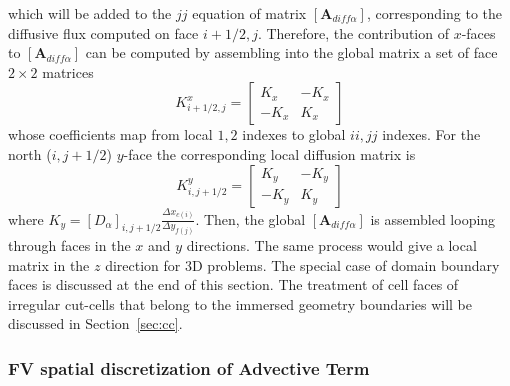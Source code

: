 \documentclass[12pt]{article}
\begin{document}
%
which will be added to the $jj$ equation of matrix $\left[ \mathbf{A}_{diff \alpha} \right]$, corresponding to the diffusive flux computed on face $i+1/2,j$. Therefore, the contribution of $x$-faces to $\left[ \mathbf{A}_{diff \alpha} \right]$ can be computed by assembling into the global matrix a set of face $2 \times 2$ matrices
%
\begin{equation}
   K^x_{i+1/2,j} = \left[ \begin{array}{cc} K_x & -K_x \\ -K_x & K_x \end{array} \right]
\end{equation}
whose coefficients map from local $1,2$ indexes to global $ii,jj$ indexes. 
For the north ($i,j+1/2$) $y$-face the corresponding local diffusion matrix is
%
\begin{equation}
   K^y_{i,j+1/2} = \left[ \begin{array}{cc} K_y & -K_y \\ -K_y & K_y \end{array} \right]
\end{equation}  
%
where $K_y=[D_\alpha]_{i,j+1/2} \frac{\Delta x_{c(i)}}{\Delta y_{f(j)}}$. Then, the global $\left[ \mathbf{A}_{diff \alpha} \right]$ is assembled looping through faces in the $x$ and $y$ directions. The same process would give a local matrix in the $z$ direction for 3D problems. The special case of domain boundary faces is discussed at the end of this section. The treatment of cell faces of irregular cut-cells that belong to the immersed geometry boundaries will be discussed in Section~\ref{sec:cc}.

\subsubsection*{FV spatial discretization of Advective Term}
\end{document}
